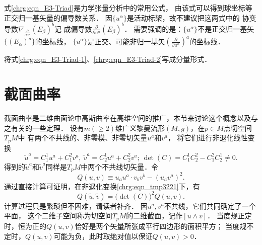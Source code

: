式\eqref{chrg:eqn_E3-Triad}是力学张量分析中的常用公式，
由该式可以得到球坐标等正交归一基矢量的偏导数关系．
因$\{u^\alpha\}$是活动标架，故不建议把这两式中的
协变导数$\nabla _{\frac{\partial }{\partial u^\alpha}} (E_\beta)^b$记
成偏导数$\frac{\partial }{\partial u^\alpha} (E_\beta)^b$．
需要强调的是：$\{u^\alpha\}$不是正交归一基矢$\{(E_\alpha)^a\}$的坐标线，
$\{u^\alpha\}$是正交、可能非归一基矢$(\frac{\partial }{\partial u^\alpha})^a$的坐标线．





\begin{exercise}
	将式\eqref{chrg:eqn_E3-Triad-1}、\eqref{chrg:eqn_E3-Triad-2}写成分量形式．
\end{exercise}



\section{截面曲率}\label{chrg:sec_sectional-curvature}
截面曲率是二维曲面论中高斯曲率在高维空间的推广，本节来讨论这个概念以及与之有关的一些定理．
设有$m(\geqslant 2)$维广义黎曼流形$(M,g)$，在$p\in M$点切空间$T_pM$中
有两个不共线的、非零模、非零切矢量$u^a$和$v^a$，
将它们进行非退化线性变换
\begin{equation}\label{chrg:eqn_tmp3221}
    \tilde{u}^a = C_1^1 u^a +C_1^2 v^a, \ \tilde{v}^a = C_2^1 u^a +C_2^2 v^a;
    \ \det(C) = C_1^1C_2^2 - C_1^2 C^1_2\neq 0 .
\end{equation}
得到的$\tilde{u}^a$和$\tilde{v}^a$同样是$T_pM$中两个不共线切矢量．令
\begin{equation}\label{chrg:eqn_tmp3222}
    Q(u,v)\equiv {u}_a{u}^a \cdot {v}_b{v}^b - ({u}_a{v}^a)^2 .
\end{equation}
通过直接计算可证明，在非退化变换\eqref{chrg:eqn_tmp3221}下，有
\begin{equation}\label{chrg:eqn_tmp3223}
    Q(\tilde{u},\tilde{v}) = \bigl(\det(C)\bigr)^2 Q(u,v) .
\end{equation}
计算过程只是繁琐但不困难，请读者补齐．
因$u^a,v^a$不共线，它们共同确定了一个平面，
这个二维子空间称为切空间$T_pM$的{\heiti 二维截面}，记作$[u\wedge v]$．
当度规正定时，恒为正的$Q(u,v)$恰好是两个矢量所张成平行四边形的面积平方；
当度规不定时，$Q(u,v)$可能为负，此时取绝对值以保证$Q(u,v)>0$．

